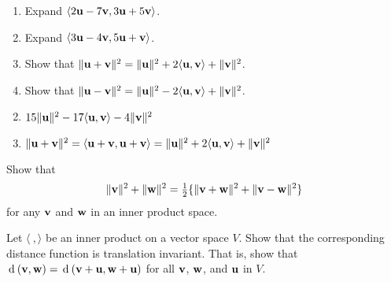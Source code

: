 \begin{multicols}{2}
\begin{ex}
\begin{enumerate}[label={\alph*.}]
\item Expand $\langle2\textbf{u} - 7\textbf{v}, 3\textbf{u} + 5\textbf{v} \rangle$.

\item Expand $\langle3\textbf{u} - 4\textbf{v}, 5\textbf{u} + \textbf{v} \rangle$.

\item Show that $\| \textbf{u} + \textbf{v} \| ^2 = \| \textbf{u} \| ^2 + 2 \langle \textbf{u}, \textbf{v} \rangle + \| \textbf{v} \| ^2 $.

\item Show that $\| \textbf{u} - \textbf{v} \| ^2 = \| \textbf{u} \| ^2 - 2 \langle \textbf{u}, \textbf{v} \rangle + 
\| \textbf{v} \| ^2$.

\end{enumerate}
\begin{sol}
\begin{enumerate}[label={\alph*.}]
\setcounter{enumi}{1}
\item  $15\|\textbf{u}\|^{2} - 17 \langle \textbf{u}, \textbf{v} \rangle - 4\|\textbf{v}\|^{2}$

\setcounter{enumi}{3}
\item  $\|\textbf{u} + \textbf{v}\|^{2} = \langle \textbf{u} + \textbf{v}, \textbf{u} + \textbf{v} \rangle = \|\textbf{u}\|^{2} + 2\langle \textbf{u}, \textbf{v}\rangle + \|\textbf{v}\|^{2}$

\end{enumerate}
\end{sol}
\end{ex}

\begin{ex}
Show that 
\begin{equation*}
\| \textbf{v} \| ^2 +
\| \textbf{w} \| ^2 = \tfrac{1}{2} \{
\| \textbf{v} + \textbf{w} \| ^2 +
\| \textbf{v} - \textbf{w} \| ^2\}
\end{equation*}
for any $\textbf{v}$ and $\textbf{w}$ in an inner product space.
\end{ex}

\begin{ex}
Let $\langle\ , \rangle$ be an inner product on a vector space $V$. Show that the corresponding distance function is translation invariant. That is, show that \newline $\thinspace\operatorname{d\medspace}(\textbf{v}, \textbf{w}) = \thinspace\operatorname{d\medspace}(\textbf{v} + \textbf{u}, \textbf{w} + \textbf{u})$ for all $\textbf{v}$, $\textbf{w}$, and $\textbf{u}$ in $V$.
\end{ex}


\end{multicols}
